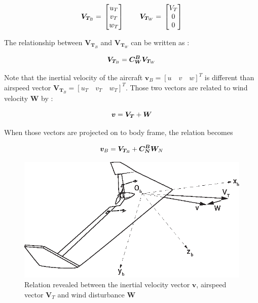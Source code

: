 \begin{equation}{\label{eqn:airspeedComponents}}
\bm{V}_{\bm{T}_B}
=\,
\begin{bmatrix}
u_{T} \\
v_{T}\\
w_{T}\\
\end{bmatrix}
\qquad \,
\bm{V}_{\bm{T}_W}
=\,
\begin{bmatrix}
V_{T} \\
0\\
0\\
\end{bmatrix}
\end{equation}

The relationship between $\bm{V}_{\bm{T}_B}$ and $\bm{V}_{\bm{T}_W}$ can be written as \cite{ducard2009fault}:

\begin{equation}{\label{eqn:airspeedVectorTransformation}}
\bm{V}_{\bm{T}_B}=\bm{C_W^B}\bm{V}_{\bm{T}_W}
\end{equation}

Note that the inertial velocity of the aircraft $\bm{v}_B = {[u \quad v \quad w]}^T$ is different than airspeed vector $\bm{V}_{\bm{T}_B} = {[u_T \quad v_T \quad w_T ]}^T$. 
Those two vectors are related to wind velocity $\bm{W}$ by :

\begin{equation}{\label{eqn:inertialVelocityAirspeedVectorWind}}
\bm{v}=\bm{V_T} + \bm{W}
\end{equation}

When those vectors are projected on to body frame, the relation becomes

\begin{equation}{\label{eqn:inertialVelocityAirspeedVectorWind}}
\bm{v}_B=\bm{V}_{\bm{T}_B} + \bm{C_N^B} \bm{W}_N
\end{equation}

\begin{figure}
\begin{center}
\includegraphics[width=13cm]{figures/ZagiWindDisturbance}    %
\caption{Relation revealed between the inertial velocity vector $\bm{v}$, airspeed vector $\bm{V}_T$ and wind disturbance $\bm{W}$ \cite{ducard2009fault}} 
\label{fig:windDisturbance}
\end{center}
\end{figure}

